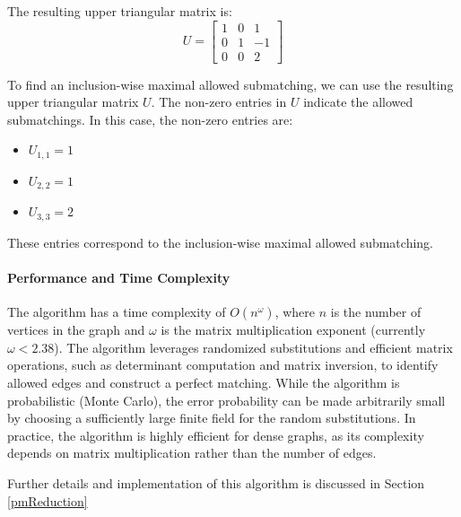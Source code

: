 The resulting upper triangular matrix is:
\[
U = 
\begin{bmatrix} 
1 & 0 & 1 \\
0 & 1 & -1 \\
0 & 0 & 2
\end{bmatrix}
\]

To find an inclusion-wise maximal allowed submatching, we can use the resulting upper triangular matrix \( U \). The non-zero entries in \( U \) indicate the allowed submatchings. In this case, the non-zero entries are:
\begin{itemize}
    \item \( U_{1,1} = 1 \)
    \item \( U_{2,2} = 1 \)
    \item \( U_{3,3} = 2 \)
\end{itemize}
These entries correspond to the inclusion-wise maximal allowed submatching.

\paragraph{Performance and Time Complexity}
The algorithm has a time complexity of $O(n^\omega)$, where $n$ is the number of vertices in the graph and $\omega$ is the matrix multiplication exponent (currently $\omega < 2.38$). The algorithm leverages randomized substitutions and efficient matrix operations, such as determinant computation and matrix inversion, to identify allowed edges and construct a perfect matching. While the algorithm is probabilistic (Monte Carlo), the error probability can be made arbitrarily small by choosing a sufficiently large finite field for the random substitutions. In practice, the algorithm is highly efficient for dense graphs, as its complexity depends on matrix multiplication rather than the number of edges.

\noindent Further details and implementation of this algorithm is discussed in Section \ref{pmReduction}
